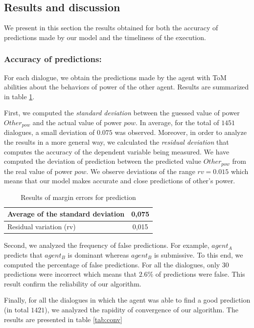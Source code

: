 \documentclass[conference, letterpaper]{IEEEtran}
\begin{document}
\subsection{Results and discussion}
We present in this section the results obtained for both the accuracy of predictions made by our model and the timeliness of the execution.

\subsubsection{Accuracy of predictions:} For each dialogue, we obtain the predictions made by the agent with ToM abilities about the behaviors of power of the other agent. Results are summarized in table \ref{tab:res1}. 


First, we computed the \emph{standard deviation} between the guessed value of power $Other_{pow}$ and the actual value of power $pow$. In average, for the total of $1451$ dialogues, a small deviation of $0.075$ was observed. Moreover, in order to analyze the results in a more general way, we calculated the \emph{residual deviation }  that computes the accuracy of the dependent variable being measured. We have computed the deviation of prediction between the predicted value  $Other_{pow}$ from the real value of power $pow$. 
We observe deviations of the range $rv = 0.015$ which means that our model makes accurate and close predictions of other's power.


\begin{table}[h]
	\centering
	\begin{tabular}{|l|c|}
		\hline
		Average of the standard deviation & 0,075 \\
		\hline
		Residual variation (rv) & 0,015 \\
		\hline
	\end{tabular}
	\caption{Results of margin errors for prediction} 
	\label{tab:res1}
\end{table}

Second, we analyzed the frequency of false predictions. For example, $agent_A$ predicts that $agent_B$ is dominant whereas $agent_B$ is submissive. To this end, we computed the percentage of false predictions. For all the dialogues, only $30$ predictions were incorrect which means that $ 2.6 \% $ of predictions were false. This result confirm the reliability of our algorithm. 

Finally, for all the dialogues in which the agent was able to find a good prediction (in total $1421$), we analyzed the rapidity of convergence of our algorithm. The results are presented in table \ref{tab:conv}
\end{document}
